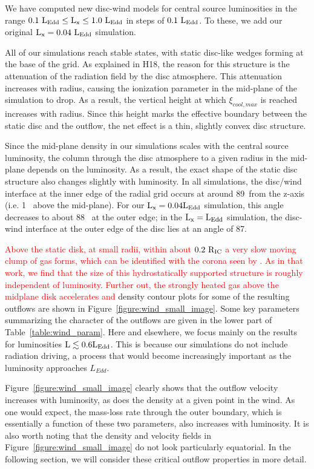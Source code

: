 \documentclass[a4paper,fleqn,usenatbib]{mnras}
\begin{document}
We have computed new disc-wind models for central source luminosities
in the range $\rm{0.1~L_{Edd} \leq L_x \leq 1.0~L_{Edd}}$ in steps of
$\rm{0.1~L_{Edd}}$. To these, we add our original
$\rm{L_x=0.04~L_{Edd}}$ simulation. 

All of our simulations reach stable states, with static disc-like
wedges forming at the base of the grid.
 As explained in H18, the
reason for this structure is the attenuation of the radiation field by the disc
atmosphere. This attenuation increases with radius, causing the
ionization parameter in the mid-plane of the simulation to drop. As a
result, the vertical height at which $\xi_{cool,max}$ is reached
increases with radius. Since this height marks the effective boundary
between the static disc and the outflow, the net effect is a thin,
slightly convex disc structure. 

Since the mid-plane density in our simulations scales with the central
source luminosity, the column through the disc atmosphere to a given
radius in the mid-plane depends on the luminosity. As a result, the
exact shape of the static disc structure also changes slightly with
luminosity. In all simulations, the disc/wind interface at the
inner edge of the radial grid occurs at around 89\degree~from the
z-axis (i.e. 1\degree~ above the mid-plane). For our $\rm{L_x = 0.04L_{Edd}}$ 
simulation, this angle decreases to about 88\degree~ at the outer
edge; in the $\rm{L_x = L_{Edd}}$ simulation, the disc-wind interface at
the outer edge of the disc lies at an angle of 87\degree.

 \textcolor{red}{Above the static disk, at small radii,
within about $\rm{0.2~R_{IC}}$ a very slow moving clump of gas forms, 
which can be identified with the corona seen by \citep{1996ApJ...461..767W}.
As in that work, we find that the size of this hydrostatically supported structure
is roughly independent of luminosity. Further out, the strongly heated gas above 
the midplane disk accelerates and}
density contour plots for some of the resulting outflows are shown in
Figure~\ref{figure:wind_small_image}. Some key parameters summarizing
the character of the outflows are given in the lower part of Table~\ref{table:wind_param}. 
Here and elsewhere, we focus mainly on the
results for luminosities $\rm{L \lesssim 0.6 L_{Edd}}$. This is
because our simulations do not include radiation driving, a process
that would become increasingly important as the luminosity approaches $L_{Edd}$. 

Figure~\ref{figure:wind_small_image} clearly shows that the outflow
velocity increases with luminosity, as does the density at a given
point in the wind. As one would expect, the mass-loss rate through the
outer boundary, which is essentially a function of these two
parameters, also increases with luminosity. It is also worth noting
that the density and velocity fields in
Figure~\ref{figure:wind_small_image} do not look particularly 
equatorial. In the following section, we
will consider these critical outflow properties in more detail.
\end{document}
